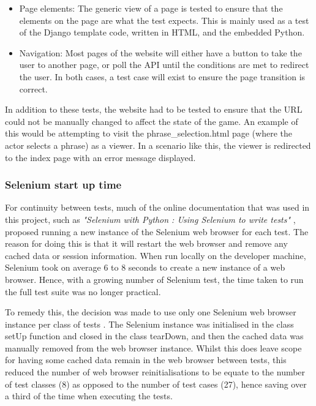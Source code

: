 \begin{itemize}
	\item Page elements: The generic view of a page is tested to ensure that the elements on the page are what the test expects. This is mainly used as a test of the Django template code, written in HTML, and the embedded Python.
	\item Navigation: Most pages of the website will either have a button to take the user to another page, or poll the API until the conditions are met to redirect the user. In both cases, a test case will exist to ensure the page transition is correct. 
\end{itemize}

In addition to these tests, the website had to be tested to ensure that the URL could not be manually changed to affect the state of the game. An example of this would be attempting to visit the phrase\_selection.html page (where the actor selects a phrase) as a viewer.  In a scenario like this, the viewer is redirected to the index page with an error message displayed.

\subsubsection{Selenium start up time}
For continuity between tests, much of the online documentation that was used in this project, such as \textit{"Selenium with Python : Using Selenium to write tests"} \cite{selenium_guide}, proposed running a new instance of the Selenium web browser for each test. The reason for doing this is that it will restart the web browser and remove any cached data or session information. When run locally on the developer machine, Selenium took on average 6 to 8 seconds to create a new instance of a web browser. Hence, with a growing number of Selenium test, the time taken to run the full test suite was no longer practical.

To remedy this, the decision was made to use only one Selenium web browser instance per class of tests \cite{django_live_server_test}. The Selenium instance was initialised in the class setUp function and closed in the class tearDown, and then the cached data was manually removed from the web browser instance. Whilst this does leave scope for having some cached data remain in the web browser between tests, this reduced the number of web browser reinitialisations to be equate to the number of test classes (8) as opposed to the number of test cases (27), hence saving over a third of the time when executing the tests.

